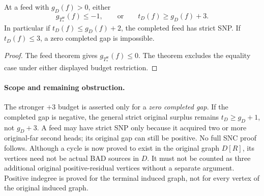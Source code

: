 \begin{corollary}
\label{cor:weak-closure-low-budget-strict-feed}
At a feed with $g_D(f)>0$, either
\[
 g_{T^{\mathrm w}_*}(f)\le-1,
 \qquad\text{or}\qquad
 t_D(f)\ge g_D(f)+3.
\]
In particular if $t_D(f)\le g_D(f)+2$, the completed feed has strict
SNP. If $t_D(f)\le3$, a zero completed gap is impossible.
\end{corollary}
\begin{proof}
The feed theorem gives $g_{T^{\mathrm w}_*}(f)\le0$. The theorem excludes
the equality case under either displayed budget restriction.
\end{proof}

\paragraph{Scope and remaining obstruction.}
The stronger $+3$ budget is asserted only for a \emph{zero completed
gap}. If the completed gap is negative, the general strict original
surplus remains $t_D\ge g_D+1$, not $g_D+3$. A feed may have strict
SNP only because it acquired two or more original-far second heads;
its original gap can still be positive. No full SNC proof follows.
Although a cycle is now proved to exist in the original graph $D[R]$,
its vertices need not be actual BAD sources in $D$. It must not be counted
as three additional original positive-residual vertices without a
separate argument. Positive indegree is proved for the terminal induced
graph, not for every vertex of the original induced graph.
